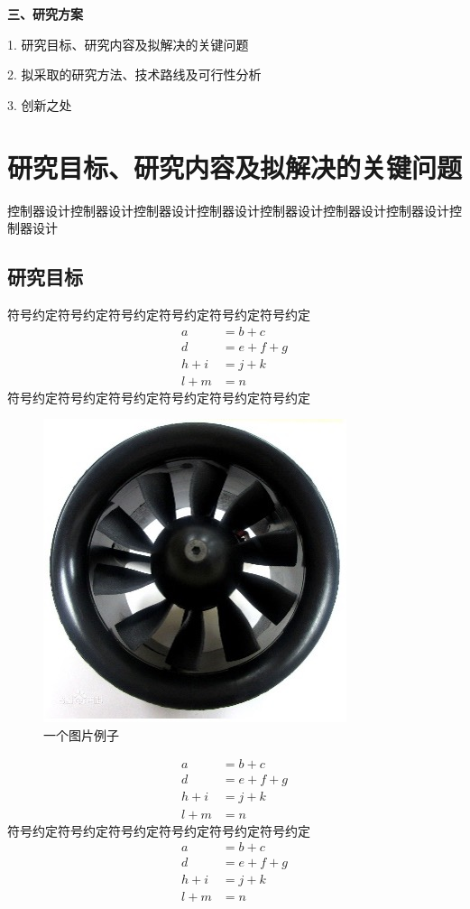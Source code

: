\textbf{\fangsong\xiaosihao 三、研究方案}
\vspace{-0.30cm}
\begin{ubox}
\setcounter{section}{0}
\setcounter{figure}{0}
\setcounter{table}{0}
\setlength{\parindent}{0em} 
1. 研究目标、研究内容及拟解决的关键问题
\vspace{-0.25cm}

2. 拟采取的研究方法、技术路线及可行性分析
\vspace{-0.25cm}

3. 创新之处
\setlength{\parindent}{2em} 
\section{研究目标、研究内容及拟解决的关键问题}
控制器设计控制器设计控制器设计控制器设计控制器设计控制器设计控制器设计控制器设计
\subsection{研究目标}
符号约定符号约定符号约定符号约定符号约定符号约定
\setcounter{equation}{0} 
\begin{equation}
	\begin{aligned}
		a &= b + c \\
		d &= e + f + g \\
		h + i &= j + k \\
		l + m &= n
	\end{aligned}
\end{equation}
符号约定符号约定符号约定符号约定符号约定符号约定
\begin{figure}[H]
	\centering
	\includegraphics[width=0.4\linewidth]{p1.jpg}
	\caption{一个图片例子}
	\label{fig:main}
\end{figure}

\begin{equation}
	\begin{aligned}
		a &= b + c \\
		d &= e + f + g \\
		h + i &= j + k \\
		l + m &= n
	\end{aligned}
\end{equation}
符号约定符号约定符号约定符号约定符号约定符号约定
\begin{equation}
	\begin{aligned}
		a &= b + c \\
		d &= e + f + g \\
		h + i &= j + k \\
		l + m &= n
	\end{aligned}
\end{equation}

\end{ubox}
